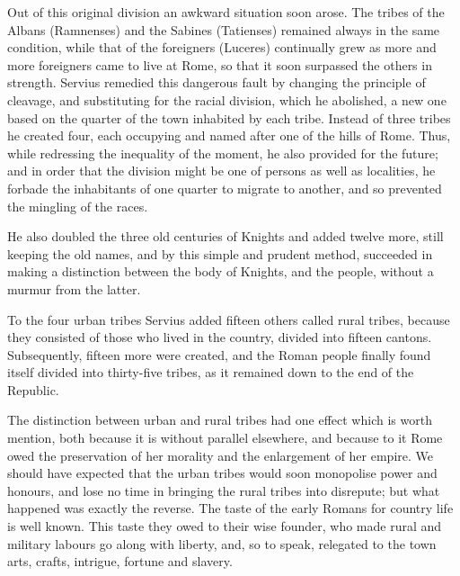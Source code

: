 \documentclass[12pt]{book}
\begin{document}
Out of this original division an awkward situation soon arose. The tribes of the Albans (Ramnenses) and the Sabines (Tatienses) remained always in the same condition, while that of the foreigners (Luceres) continually grew as more and more foreigners came to live at Rome, so that it soon surpassed the others in strength. Servius remedied this dangerous fault by changing the principle of cleavage, and substituting for the racial division, which he abolished, a new one based on the quarter of the town inhabited by each tribe. Instead of three tribes he created four, each occupying and named after one of the hills of Rome. Thus, while redressing the inequality of the moment, he also provided for the future; and in order that the division might be one of persons as well as localities, he forbade the inhabitants of one quarter to migrate to another, and so prevented the mingling of the races.

He also doubled the three old centuries of Knights and added twelve more, still keeping the old names, and by this simple and prudent method, succeeded in making a distinction between the body of Knights, and the people, without a murmur from the latter.

To the four urban tribes Servius added fifteen others called rural tribes, because they consisted of those who lived in the country, divided into fifteen cantons. Subsequently, fifteen more were created, and the Roman people finally found itself divided into thirty-five tribes, as it remained down to the end of the Republic.

The distinction between urban and rural tribes had one effect which is worth mention, both because it is without parallel elsewhere, and because to it Rome owed the preservation of her morality and the enlargement of her empire. We should have expected that the urban tribes would soon monopolise power and honours, and lose no time in bringing the rural tribes into disrepute; but what happened was exactly the reverse. The taste of the early Romans for country life is well known. This taste they owed to their wise founder, who made rural and military labours go along with liberty, and, so to speak, relegated to the town arts, crafts, intrigue, fortune and slavery.
\end{document}
